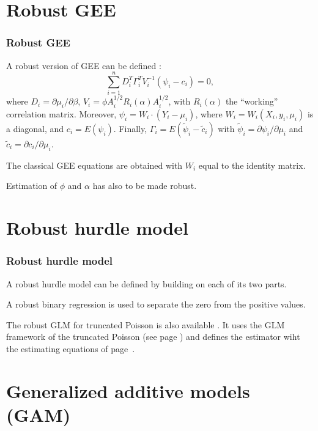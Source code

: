 \documentclass{beamer}
\newcommand{\bs}{\bigskip}
\begin{document}
\section{Robust GEE}
\begin{frame}
\frametitle{Robust GEE}

A {\color{blue}robust version of GEE} can be defined \cite{Cant:2004}:
$$\sum_{i=1}^n D_i^T \Gamma_i^T V_i^{-1} (\psi_i - c_i) =0,$$
where $D_i = \partial \mu_i / \partial \beta$, $V_i =
 \phi A_i^{1/2} R_i(\alpha) A_i^{1/2}$, with  $R_i(\alpha)$
the ``working'' correlation matrix.
Moreover, $\psi_i = W_i \cdot (Y_i - \mu_i)$, where $W_i = W_i(X_i, y_i, \mu_i)$
is a diagonal, and $c_i = E(\psi_i)$. Finally, $\Gamma_i = E(\tilde{\psi}_i -
\tilde{c}_i)$ with $\tilde{\psi}_i = \partial \psi_i / \partial \mu_i$ and $
\tilde{c}_i = \partial {c}_i / \partial \mu_i$.

\bs
The classical GEE equations are obtained with $W_i$ equal to the identity
matrix.

\bs
Estimation of $\phi$ and $\alpha$ has also to be made robust.

\end{frame}

\section{Robust hurdle model}
\begin{frame}
\frametitle{Robust hurdle model}

A {\color{blue}robust hurdle} model can be defined by building on each of its
two parts.

\bs
A robust binary regression is used to separate the zero from the positive
values. 

\bs
The robust GLM for truncated Poisson is also available \cite{Cant:Zedi:2011}. It
uses the GLM framework of the truncated Poisson (see page
\pageref{truncpoisdef}) and defines  the estimator wiht the estimating equations
of page~\pageref{EE.eq}. 
\end{frame}

\section{Generalized additive models (GAM)}
\label{GAM.section}
\end{document}
